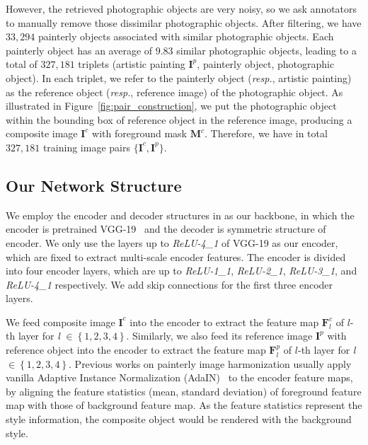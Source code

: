 \documentclass[letterpaper]{article} %
\begin{document}
However, the retrieved photographic objects are very noisy, so we ask annotators to manually remove those dissimilar photographic objects. After filtering, we have $33,294$ painterly objects associated with similar photographic objects.
Each painterly object has an average of $9.83$ similar photographic objects, leading to a total of $327,181$  triplets (artistic painting $\bm{I}^p$, painterly object, photographic object). In each triplet, we refer to the painterly object (\emph{resp.}, artistic painting) as the reference object (\emph{resp.}, reference image) of the photographic object. As illustrated in Figure~\ref{fig:pair_construction}, we put the photographic object within the bounding box of reference object in the reference image, producing a composite image $\bm{I}^c$ with foreground mask $\bm{M}^c$. Therefore, we have in total $327,181$ training image pairs $\{\bm{I}^c, \bm{I}^p\}$.

\subsection{Our Network Structure} \label{sec:network_structure}

We employ the encoder and decoder structures in \cite{huang2017arbitrary} as our backbone, in which the encoder is pretrained VGG-19~\cite{VGG19} and the decoder is symmetric structure of encoder. We only use the layers up to \emph{ReLU-4\_1} of VGG-19 as our encoder, which are fixed to extract multi-scale encoder features. The encoder is divided into four encoder layers, which are up to \emph{ReLU-1\_1}, \emph{ReLU-2\_1}, \emph{ReLU-3\_1}, and \emph{ReLU-4\_1} respectively. We add skip connections for the first three encoder layers.

We feed composite image $\bm{I}^c$ into the encoder to extract the feature map $\bm{F}_l^c$ of $l$-th layer for \emph{l} $\in \left\{1, 2, 3, 4\right\}$. Similarly, we also feed its reference image $\bm{I}^p$ with reference object into the encoder to extract the feature map $\bm{F}^p_l$ of $l$-th layer for \emph{l} $\in \left\{1, 2, 3, 4\right\}$.
Previous works on painterly image harmonization \cite{peng2019element,cao2022painterly} usually apply vanilla Adaptive Instance Normalization (AdaIN)~\cite{huang2017arbitrary} to the encoder feature maps, by aligning the feature statistics (mean, standard deviation) of foreground feature map with those of background feature map. As the feature statistics represent the style information, the composite object would be rendered with the background style.
\end{document}
